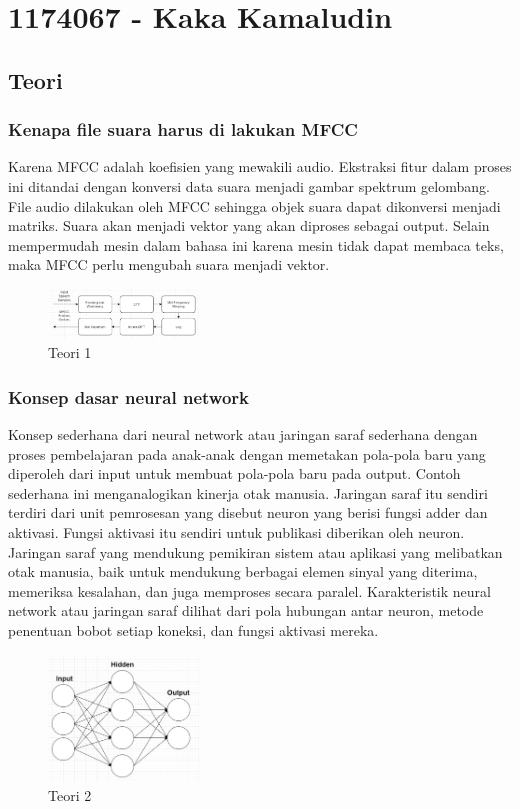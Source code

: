 \section{1174067 - Kaka Kamaludin}
\subsection{Teori}
\subsubsection{Kenapa file suara harus di lakukan MFCC}
\hfill\break
Karena MFCC adalah koefisien yang mewakili audio. Ekstraksi fitur dalam proses ini ditandai dengan konversi data suara menjadi gambar spektrum gelombang. File audio dilakukan oleh MFCC sehingga objek suara dapat dikonversi menjadi matriks. Suara akan menjadi vektor yang akan diproses sebagai output. Selain mempermudah mesin dalam bahasa ini karena mesin tidak dapat membaca teks, maka MFCC perlu mengubah suara menjadi vektor.
\begin{figure}[H]
\centering
	\includegraphics[width=4cm]{figures/1174067/6/1.jpg}
\caption{Teori 1}
\end{figure}

\subsubsection{Konsep dasar neural network}
\hfill\break
Konsep sederhana dari neural network atau jaringan saraf sederhana dengan proses pembelajaran pada anak-anak dengan memetakan pola-pola baru yang diperoleh dari input untuk membuat pola-pola baru pada output. Contoh sederhana ini menganalogikan kinerja otak manusia. Jaringan saraf itu sendiri terdiri dari unit pemrosesan yang disebut neuron yang berisi fungsi adder dan aktivasi. Fungsi aktivasi itu sendiri untuk publikasi diberikan oleh neuron. Jaringan saraf yang mendukung pemikiran sistem atau aplikasi yang melibatkan otak manusia, baik untuk mendukung berbagai elemen sinyal yang diterima, memeriksa kesalahan, dan juga memproses secara paralel. Karakteristik neural network atau jaringan saraf dilihat dari pola hubungan antar neuron, metode penentuan bobot setiap koneksi, dan fungsi aktivasi mereka.
\begin{figure}[H]
\centering
	\includegraphics[width=4cm]{figures/1174067/6/2.jpg}
\caption{Teori 2}
\end{figure}

